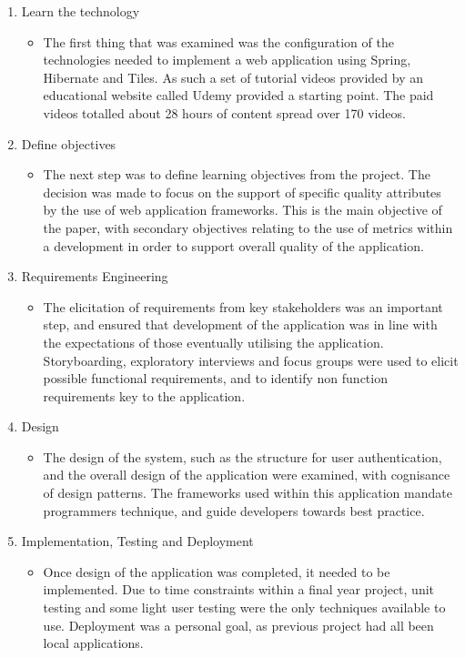 \begin{enumerate}
\item Learn the technology
\begin{itemize}
\item The first thing that was examined was the configuration of the technologies needed to implement a web application using Spring, Hibernate and Tiles. As such a set of tutorial videos provided by an educational website called Udemy provided a starting point. The paid videos totalled about 28 hours of content spread over 170 videos.\parencite{udemy}
\end{itemize}
\item Define objectives
\begin{itemize}
\item The next step was to define learning objectives from the project. The decision was made to focus on the support of specific quality attributes by the use of web application frameworks. This is the main objective of the paper, with secondary objectives relating to the use of metrics within a development in order to support overall quality of the application.
\end{itemize}
\item Requirements Engineering
\begin{itemize}
\item The elicitation of requirements from key stakeholders was an important step, and ensured that development of the application was in line with the expectations of those eventually utilising the application. Storyboarding, exploratory interviews and focus groups were used to elicit possible functional requirements, and to identify non function requirements key to the application.
\end{itemize}
\item Design
\begin{itemize}
\item The design of the system, such as the structure for user authentication, and the overall design of the application were examined, with cognisance of design patterns. The frameworks used within this application mandate programmers technique, and guide developers towards best practice.
\end{itemize}
\item Implementation, Testing and Deployment
\begin{itemize}
\item Once design of the application was completed, it needed to be implemented. Due to time constraints within a final year project, unit testing and some light user testing were the only techniques available to use. Deployment was a personal goal, as previous project had all been local applications.

\end{itemize}
\end{enumerate}

